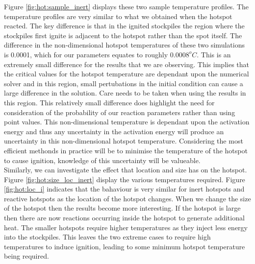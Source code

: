 Figure \ref{fig:hot:sample_inert} displays these two sample temperature profiles. The temperature profiles are very similar to what we obtained when the hotspot reacted. The key difference is that in the ignited stockpiles the region where the stockpiles first ignite is adjacent to the hotspot rather than the spot itself. The difference in the non-dimensional hotspot temperatures of these two simulations is 0.0001, which for our parameters equates to roughly $0.0008^oC$. This is an extremely small difference for the results that we are observing. This implies that the critical values for the hotspot temperature are dependant upon the numerical solver and in this region, small pertubations in the initial condition can cause a large difference in the solution. Care needs to be taken when using the results in this region. This relatively small difference does highlight the need for consideration of the probability of our reaction parameters rather than using point values. This non-dimensional temperature is dependant upon the activation energy and thus any uncertainty in the activation energy will produce an uncertainty in this non-dimensional hotspot temperature. Considering the most efficient methonds in practice will be to minimise the temperature of the hotspot to cause ignition, knowledge of this uncertainty will be valueable.\\

Similarly, we can investigate the effect that location and size has on the hotspot. Figure \ref{fig:hot:size_loc_inert} display the various temperatures required. Figure \ref{fig:hot:loc_i} indicates that the bahaviour is very similar for inert hotspots and reactive hotspots as the location of the hotspot changes. When we change the size of the hotspot then the results become more interesting. If the hotspot is large then there are now reactions occurring inside the hotspot to generate additional heat. The smaller hotspots require higher temperatures as they inject less energy into the stockpiles. This leaves the two extreme cases to require high temperatures to induce ignition, leading to some minimum hotspot temperature being required. \\

